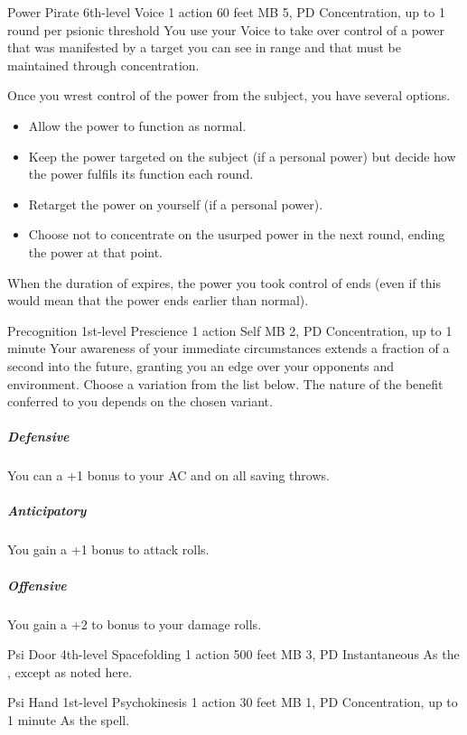 \DndPowerHeader%
  {Power Pirate}
  {6th-level Voice}
  {1 action}
  {60 feet}
  {MB 5, PD \lvlsix}
  {Concentration, up to 1 round per psionic threshold}
  You use your Voice to take over control of a power
  that was manifested by a target you can see in range
  and that must be maintained through concentration.

  Once you wrest control of the power from the subject,
  you have several options.
  \begin{itemize}
    \item Allow the power to function as normal.
    \item Keep the power targeted on the subject
          (if a personal power) but decide how the power
          fulfils its function each round.
    \item Retarget the power on yourself (if a personal power).
    \item Choose not to concentrate on the usurped power
            in the next round, ending the power at that point.
  \end{itemize}
When the duration of  expires,
the power you took control of ends
(even if this would mean that the power ends earlier than normal).

\DndPowerHeader%
  {Precognition}
  {1st-level Prescience}
  {1 action}
  {Self}
  {MB 2, PD \lvlone}
  {Concentration, up to 1 minute}
Your awareness of your immediate circumstances extends
a fraction of a second into the future,
granting you an edge over your opponents and environment.
Choose a variation from the list below.
The nature of the benefit conferred to you
depends on the chosen variant.
\subparagraph{Defensive}
  You can a +1 bonus to your AC and on all saving throws.
\subparagraph{Anticipatory}
  You gain a +1 bonus to attack rolls.
\subparagraph{Offensive}
  You gain a +2 to bonus to your damage rolls.

\DndPowerHeader%
  {Psi Door}
  {4th-level Spacefolding}
  {1 action}
  {500 feet}
  {MB 3, PD \lvlfour}
  {Instantaneous}
As the , except as noted here.

\DndPowerHeader%
  {Psi Hand}
  {1st-level Psychokinesis}
  {1 action}
  {30 feet}
  {MB 1, PD \lvlone}
  {Concentration, up to 1 minute}
As the  spell.

